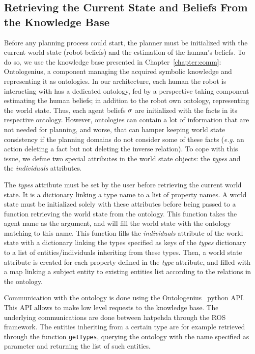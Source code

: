 \documentclass[a4paper,11pt,twoside]{StyleThese}
\begin{document}
\subsection{Retrieving the Current State and Beliefs From the Knowledge Base}
Before any planning process could start, the planner must be initialized with the current world state (robot beliefs) and the estimation of the human's beliefs. To do so, we use the knowledge base presented in Chapter~\ref{chapter:comm}: Ontologenius, a component managing the acquired symbolic knowledge and representing it as ontologies. In our architecture, each human the robot is interacting with has a dedicated ontology, fed by a perspective taking component estimating the human beliefs; in addition to the robot own ontology, representing the world state. Thus, each agent beliefs $\sigma$ are initialized with the facts in its respective ontology.
However, ontologies can contain a lot of information that are not needed for planning, and worse, that can hamper keeping world state consistency if the planning domains do not consider some of these facts (\textit{e.g.} an action deleting a fact but not deleting the inverse relation). To cope with this issue, we define two special attributes in the world state objects: the \textit{types} and the \textit{individuals} attributes.

The \textit{types} attribute must be set by the user before retrieving the current world state. It is a dictionary linking a type name to a list of property names. A world state must be initialized solely with these attributes before being passed to a function retrieving the world state from the ontology. This function takes the agent name as the argument, and will fill the world state with the ontology matching to this name. This function fills the \textit{individuals} attribute of the world state with a dictionary linking the types specified as keys of the  \textit{types} dictionary to a list of entities/individuals inheriting from these types. Then, a world state attribute is created for each property defined in the \textit{type} attribute, and filled with a map linking a subject entity to existing entities list according to the relations in the ontology. 

Communication with the ontology is done using the Ontologenius~\cite{sarthou2019ontologenius} python API. This API allows to make low level requests to the knowledge base. The underlying communications are done between \acrshort{hatpehda} through the ROS framework. The entities inheriting from a certain type are for example retrieved through the function \verb'getTypes', querying the ontology with the name specified as parameter and returning the list of such entities.
\end{document}
